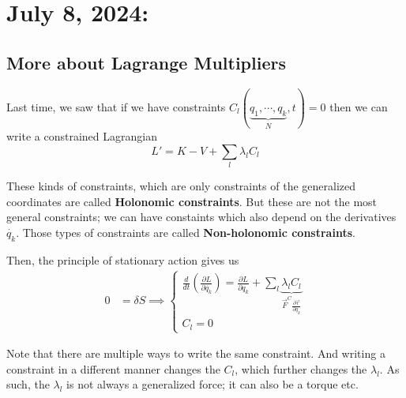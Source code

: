 \documentclass[11pt]{article}
\begin{document}
    

    




\pagebreak
\section{July 8, 2024:}

\vskip 0.5cm
\subsection{More about Lagrange Multipliers}
Last time, we saw that if we have constraints $C_l \left(\underbrace{q_1, \cdots, q_k}_{N}, t\right) = 0$ then we can write a constrained Lagrangian
\[ L' = K - V + \sum_{l} \lambda_l C_l \]

These kinds of constraints, which are only constraints of the generalized coordinates are called \textbf{Holonomic constraints}. But these are not the most general constraints; we can have constaints which also depend on the derivatives $\dot{q_{k}}$. Those types of constraints are called \textbf{Non-holonomic constraints}.

Then, the principle of stationary action gives us 
\begin{align*}
  0 &= \delta S \implies \begin{cases}
    \frac{d}{dt} \left( \frac{\partial L}{\partial \dot{q_{k}}} \right) = \frac{\partial L}{\partial q_{k}} + \sum_{l} \underbrace{\lambda_l C_l}_{\vec{F}^C \frac{\partial \vec{r}}{\partial q_{k}} } \\
    C_l = 0
  \end{cases}
\end{align*}

\vskip 0.5cm
Note that there are multiple ways to write the same constraint. And writing a constraint in a different manner changes the $C_l$, which further changes the $\lambda_l$. As such, the $\lambda_l$ is not always a generalized force; it can also be a torque etc.
\end{document}
